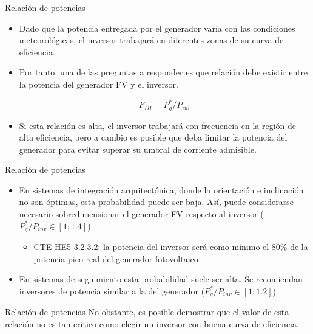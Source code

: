 \documentclass[xcolor={usenames,svgnames,dvipsnames}]{beamer}
\begin{document}
\begin{frame}[label={sec:org2b0f439}]{Relación de potencias}
\begin{itemize}
\item Dado que la potencia entregada por el generador varía con las condiciones meteorológicas, el inversor trabajará en diferentes zonas de su curva de eficiencia.

\item Por tanto, una de las preguntas a responder es \alert{que relación debe existir entre la potencia del generador FV y el inversor}.

\[F_{DI} = P_{g}^{*}/P_{inv}\]

\item Si esta relación es alta, el inversor trabajará con frecuencia en la región de alta eficiencia, pero a cambio es posible que deba limitar la potencia del generador para evitar superar su umbral de corriente admisible.
\end{itemize}
\end{frame}

\begin{frame}[label={sec:orgba0b618}]{Relación de potencias}
\begin{itemize}
\item En \alert{sistemas de integración arquitectónica}, donde la orientación e inclinación no son óptimas, esta probabilidad puede ser baja. Así, puede considerarse necesario sobredimensionar el generador FV respecto al inversor (\(P_{g}^{*}/P_{inv}\in\left[1;1.4\right]\)).

\begin{itemize}
\item CTE-HE5-3.2.3.2: \guillemotleft{}la potencia del inversor será como mínimo el 80\% de la potencia pico real del generador fotovoltaico\guillemotright{}
\end{itemize}

\item En \alert{sistemas de seguimiento} esta probabilidad suele ser alta. Se recomiendan inversores de potencia similar a la del generador  (\(P_{g}^{*}/P_{inv}\in\left[1;1.2\right]\))
\end{itemize}
\end{frame}

\begin{frame}[label={sec:org34aa765}]{Relación de potencias}
No obstante, es posible demostrar que el valor de esta relación no es tan crítico como \alert{elegir un inversor con buena curva de eficiencia}.
\end{frame}
\end{document}
